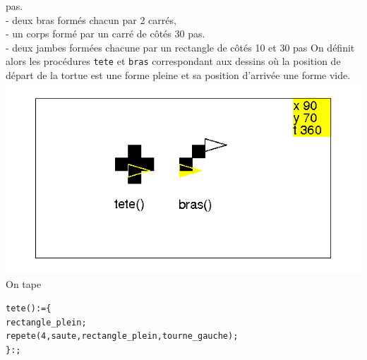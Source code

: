\documentclass[a4paper,11pt]{book}
\begin{document}
pas.\\
- deux bras form\'es chacun par 2 carr\'es,\\
- un corps form\'e par un carr\'e de c\^ot\'es 30 pas.\\
- deux jambes form\'ees chacune par un rectangle de c\^ot\'es 10 et 30 pas
On d\'efinit alors les proc\'edures {\tt tete} et {\tt bras} correspondant aux 
dessins o\`u la position de d\'epart de la tortue est une forme pleine et
 sa position d'arriv\'ee une forme vide.\\
\includegraphics[width=\textwidth]{tortbras}\\
On tape
\begin{verbatim}
tete():={
rectangle_plein;
repete(4,saute,rectangle_plein,tourne_gauche);
}:;
\end{verbatim}

%
\end{document}
